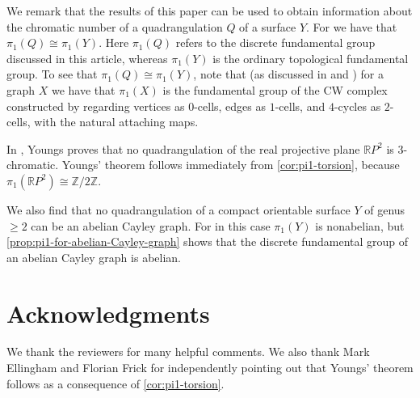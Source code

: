 \documentclass[12pt,letterpaper]{amsart}
\theoremstyle{definition}
\theoremstyle{remark}
\begin{document}
We remark that the results of this paper can be used to obtain information about the chromatic number of a quadrangulation $Q$ of a surface $Y$.  For we have that $\pi_1(Q)\cong\pi_1(Y)$.  Here $\pi_1(Q)$ refers to the discrete fundamental group discussed in this article, whereas $\pi_1(Y)$ is the ordinary topological fundamental group.  To see that $\pi_1(Q)\cong\pi_1(Y)$, note that (as discussed in \cite{matsushita} and \cite{wrochna}) for a graph $X$ we have that $\pi_1(X)$ is the fundamental group of the CW complex constructed by regarding vertices as $0$-cells, edges as $1$-cells, and $4$-cycles as $2$-cells, with the natural attaching maps.

In \cite{You}, Youngs proves that no quadrangulation of the real projective plane $\mathbb{R}P^2$ is $3$-chromatic.  Youngs' theorem follows immediately from \cref{cor:pi1-torsion}, because $\pi_1(\mathbb{R}P^2)\cong\mathbb{Z}/2\mathbb{Z}$.%

We also find that no quadrangulation of a compact orientable surface $Y$ of genus $\geq 2$ can be an abelian Cayley graph.  For in this case $\pi_1(Y)$ is nonabelian, but \cref{prop:pi1-for-abelian-Cayley-graph} shows that the discrete fundamental group of an abelian Cayley graph is abelian.

\section*{Acknowledgments}

We thank the reviewers for many helpful comments.  We also thank Mark Ellingham and Florian Frick for independently pointing out that Youngs' theorem follows as a consequence of \cref{cor:pi1-torsion}.

%
%
\end{document}
